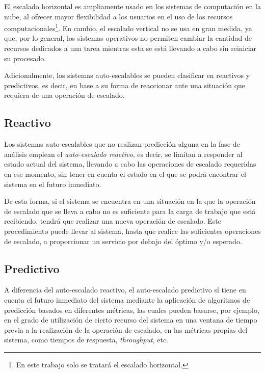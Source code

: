 El escalado horizontal es ampliamente usado en los sistemas de computación en la nube, al ofrecer 
mayor flexibilidad a los usuarios en el uso de los recursos 
computacionales\footnote{En este trabajo solo se tratará el escalado horizontal.}. En cambio, el escalado
vertical no se usa en gran medida, ya que, por lo general, los sistemas operativos no permiten cambiar
la cantidad de recursos dedicados a una tarea mientras esta se está llevando a cabo sin reiniciar su 
procesado.

Adicionalmente, los sistemas auto-escalables se pueden clasificar en reactivos y 
predictivos, es decir, en base a su forma de reaccionar ante una situación que requiera de una 
operación de escalado.


\subsection{Reactivo} \label{ssct:art_auto-escaling_reactive-autoscaling}

Los sistemas auto-escalables que no realizan predicción alguna en la fase de análisis emplean el
\textit{auto-escalado reactivo}, es decir, se limitan a responder al estado actual del sistema,
llevando a cabo las operaciones de escalado requeridas en ese momento, sin tener en cuenta el estado
en el que se podrá encontrar el sistema en el futuro inmediato.

De esta forma, si el sistema se encuentra en una situación en la que la operación de escalado que se 
lleva a cabo no es suficiente para la carga de trabajo que está recibiendo, tendrá que realizar una 
nueva operación de escalado. Este procedimiento puede llevar al sistema, hasta que realice las 
suficientes operaciones de escalado, a proporcionar un servicio por debajo del óptimo y/o esperado.


\subsection{Predictivo} \label{ssct:art_auto-escaling_predictive-autoscaling}

A diferencia del auto-escalado reactivo, el auto-escalado predictivo sí tiene en cuenta el futuro 
inmediato del sistema mediante la aplicación de algoritmos de predicción basados en diferentes métricas,
las cuales pueden basarse, por ejemplo, en el grado de utilización de cierto recurso del sistema en una 
ventana de tiempo previa a la realización de la operación de escalado, en las métricas propias del 
sistema, como tiempos de respuesta, \textit{throughput}, etc.

